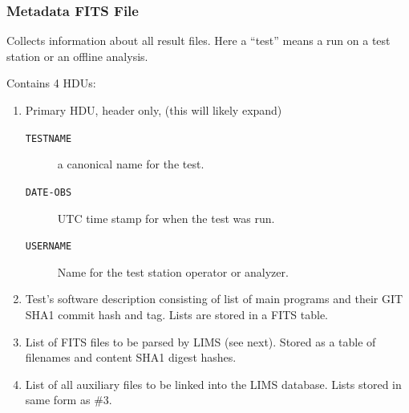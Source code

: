 \documentclass[xcolor=dvipsnames]{beamer}
\begin{document}
\begin{frame}
  \frametitle{Metadata FITS File} 

  Collects information about all result files.  Here a ``test'' means
  a run on a test station or an offline analysis.  

  Contains 4 HDUs:

  \begin{enumerate}
  \item Primary HDU, header only, (this will likely expand)
    \begin{description}
    \item[\texttt{TESTNAME}] a canonical name for the test.
    \item[\texttt{DATE-OBS}] UTC time stamp for when the test was run.
    \item[\texttt{USERNAME}] Name for the test station operator or analyzer.
    \end{description}
  \item Test's software description consisting of list of main
    programs and their GIT SHA1 commit hash and tag.  Lists are stored
    in a FITS table.
  \item List of FITS files to be parsed by LIMS (see next).  Stored as
    a table of filenames and content SHA1 digest hashes.
  \item List of all auxiliary files to be linked into the LIMS
    database.  Lists stored in same form as \#3.
  \end{enumerate}

\end{frame}
\end{document}
